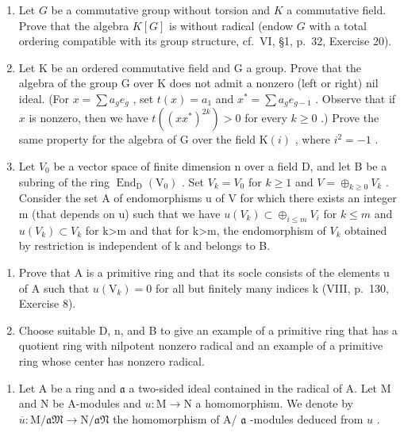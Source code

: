 \begin{enumerate}
\def\labelenumi{\arabic{enumi})}
\setcounter{enumi}{12}
\item
  Let \(G\) be a commutative group without torsion and \(K\) a commutative field. Prove that the algebra \(K[G]\) is without radical (endow \(G\) with a total ordering compatible with its group structure, cf.~VI, §1, p.~32, Exercise 20).
\item
  Let \(\mathrm{K}\) be an ordered commutative field and \(\mathrm{G}\) a group. Prove that the algebra of the group \(\mathrm{G}\) over \(\mathrm{K}\) does not admit a nonzero (left or right) nil ideal. (For \(x = \sum a_{g}e_{g}\) , set \(t(x) = a_{1}\) and \(x^{*} = \sum a_{g}e_{g - 1}\) . Observe that if \(x\) is nonzero, then we have \(t((xx^{*})^{2k}) > 0\) for every \(k\geqslant 0\) .) Prove the same property for the algebra of \(\mathrm{G}\) over the field \(\mathrm{K}(i)\) , where \(i^2 = -1\) .
\item
  Let \(V_{0}\) be a vector space of finite dimension n over a field D, and let B be a subring of the ring \(\operatorname{End}_{\mathrm{D}}(\mathrm{V}_{0})\) . Set \(V_{k}=V_{0}\) for \(k\geqslant1\) and \(V=\oplus_{k\geqslant0}V_{k}\) . Consider the set A of endomorphisms u of V for which there exists an integer m (that depends on u) such that we have \(u(V_{k})\subset\oplus_{i\leqslant m}V_{i}\) for \(k\leqslant m\) and \(u(V_{k})\subset V_{k}\) for k\textgreater m and that for k\textgreater m, the endomorphism of \(V_{k}\) obtained by restriction is independent of k and belongs to B.
\end{enumerate}

\begin{enumerate}
\def\labelenumi{\alph{enumi})}
\tightlist
\item
  Prove that A is a primitive ring and that its socle consists of the elements u of A such that \(u(\mathrm{V}_{k}) = 0\) for all but finitely many indices k (VIII, p.~130, Exercise 8).
\item
  Choose suitable D, n, and B to give an example of a primitive ring that has a quotient ring with nilpotent nonzero radical and an example of a primitive ring whose center has nonzero radical.
\end{enumerate}

\begin{enumerate}
\def\labelenumi{\arabic{enumi})}
\setcounter{enumi}{15}
\tightlist
\item
  Let A be a ring and \(\mathfrak{a}\) a two-sided ideal contained in the radical of A. Let M and N be A-modules and \(u: \mathrm{M} \to \mathrm{N}\) a homomorphism. We denote by \(\overline{u}: \mathrm{M} / \mathfrak{aM} \to \mathrm{N} / \mathfrak{aN}\) the homomorphism of A/ \(\mathfrak{a}\) -modules deduced from \(u\) .
\end{enumerate}

